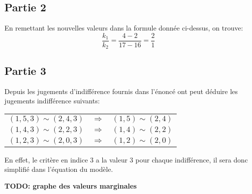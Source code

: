 \documentclass[a4paper, 12pt]{article}
\newcommand*{\indif}[2]{#1 \sim #2}
\begin{document}
		\subsection*{Partie 2}
			En remettant les nouvelles valeurs dans la formule donnée 
			ci-dessus, on trouve:
			$$ \frac{k_1}{k_2} = \frac{4 - 2}{17 - 16} = \frac{2}{1}$$
		\subsection*{Partie 3}
			Depuis les jugements d'indifférence fournis dans l'énoncé ont peut déduire
			les jugements indifférence suivants:
			\begin{center}
			\begin{tabular}{rcl}
				$\indif{(1,5,3)}{(2,4,3)}$ & $\Rightarrow$ & $\indif{(1,5)}{(2,4)}$\\
				$\indif{(1,4,3)}{(2,2,3)}$ & $\Rightarrow$ & $\indif{(1,4)}{(2,2)}$\\
				$\indif{(1,2,3)}{(2,0,3)}$ & $\Rightarrow$ & $\indif{(1,2)}{(2,0)}$
			\end{tabular}
			\end{center}
			En effet, le critère en indice $3$ a la valeur $3$ pour chaque indifférence, il
			sera donc simplifié dans l'équation du modèle.
			
			\textbf{TODO: graphe des valeurs marginales}
			
\end{document}
